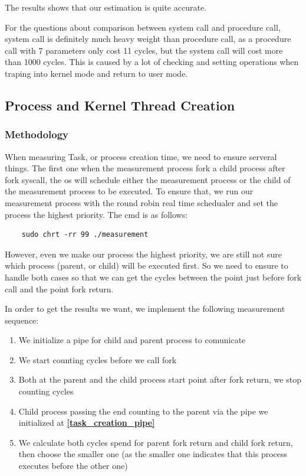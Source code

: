 The results shows that our estimation is quite accurate.

For the questions about comparison between system call and procedure call, system call is definitely much heavy weight than procedure call, as a procedure call with 7 parameters only cost 11 cycles, but the system call will cost more than 1000 cycles. This is caused by a lot of checking and setting operations when traping into kernel mode and return to user mode.

\subsection{Process and Kernel Thread Creation}

\subsubsection{Methodology}
\label {creation_methodology}

When measuring Task, or process creation time, we need to ensure serveral things. The first one when the measurement process fork a child process after fork syscall, the os will schedule either the measurement process or the child of the measurement process to be executed. To ensure that, we run our measurement process with the round robin real time schedualer and set the process the highest priority. The cmd is as follows:

\begin{lstlisting}
    sudo chrt -rr 99 ./measurement
\end{lstlisting}

However, even we make our process the highest priority,  we are still not sure which process (parent, or child) will be executed first. So we need to ensure to handle both cases so that we can get the cycles between the point just before fork call and the point fork return.

In order to get the results we want, we implement the following measurement sequence:

\begin{enumerate}
    \item We initialize a pipe for child and parent process to comunicate \label{task_creation_pipe}
    \item We start counting cycles before we call fork
    \item Both at the parent and the child process start point after fork return, we stop counting cycles
    \item Child process passing the end counting to the parent via the pipe we initialized at \textbf{\ref{task_creation_pipe}}
    \item We calculate both cycles spend for parent fork return and child fork return, then choose the smaller one (as the smaller one indicates that this process executes before the other one)
\end{enumerate}

